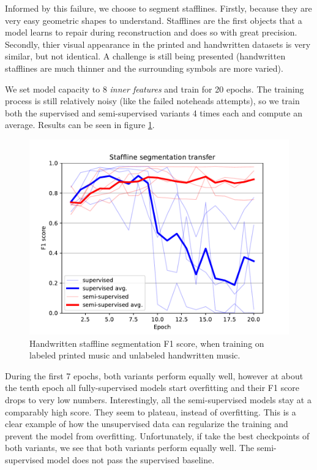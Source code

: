 Informed by this failure, we choose to segment stafflines. Firstly, because they are very easy geometric shapes to understand. Stafflines are the first objects that a model learns to repair during reconstruction and does so with great precision. Secondly, thier visual appearance in the printed and handwritten datasets is very similar, but not identical. A challenge is still being presented (handwritten stafflines are much thinner and the surrounding symbols are more varied).

We set model capacity to 8 \emph{inner features} and train for 20 epochs. The training process is still relatively noisy (like the failed noteheads attempts), so we train both the supervised and semi-supervised variants 4 times each and compute an average. Results can be seen in figure \ref{fig:StafflineTransfer}.

\begin{figure}[ht]
    \centering
    \includegraphics[width=140mm]{../../figures/04-staffline-transfer/transfer.pdf}
    \caption{Handwritten staffline segmentation F1 score, when training on labeled printed music and unlabeled handwritten music.}
    \label{fig:StafflineTransfer}
\end{figure}

During the first 7 epochs, both variants perform equally well, however at about the tenth epoch all fully-supervised models start overfitting and their F1 score drops to very low numbers. Interestingly, all the semi-supervised models stay at a comparably high score. They seem to plateau, instead of overfitting. This is a clear example of how the unsupervised data can regularize the training and prevent the model from overfitting. Unfortunately, if take the best checkpoints of both variants, we see that both variants perform equally well. The semi-supervised model does not pass the supervised baseline.

